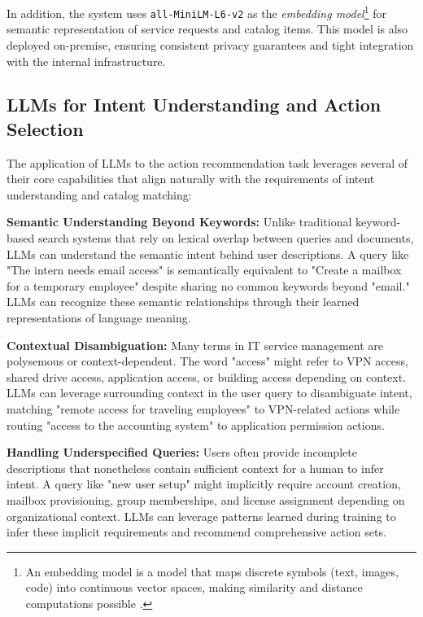 In addition, the system uses \texttt{all-MiniLM-L6-v2} as the \textit{embedding model}\footnote{An embedding model is a model that maps discrete symbols (text, images, code) into continuous vector spaces, making similarity and distance computations possible \cite{karpukhin2020densepassageretrievalopendomain}.} \cite{wang2020minilm} for semantic representation of service requests and catalog items. This model is also deployed on-premise, ensuring consistent privacy guarantees and tight integration with the internal infrastructure.

\subsection{LLMs for Intent Understanding and Action Selection}

The application of LLMs to the action recommendation task leverages several of their core capabilities that align naturally with the requirements of intent understanding and catalog matching:

\textbf{Semantic Understanding Beyond Keywords:} Unlike traditional keyword-based search systems that rely on lexical overlap between queries and documents, LLMs can understand the semantic intent behind user descriptions. A query like "The intern needs email access" is semantically equivalent to "Create a mailbox for a temporary employee" despite sharing no common keywords beyond "email." LLMs can recognize these semantic relationships through their learned representations of language meaning.

\textbf{Contextual Disambiguation:} Many terms in IT service management are polysemous or context-dependent. The word "access" might refer to VPN access, shared drive access, application access, or building access depending on context. LLMs can leverage surrounding context in the user query to disambiguate intent, matching "remote access for traveling employees" to VPN-related actions while routing "access to the accounting system" to application permission actions.

\textbf{Handling Underspecified Queries:} Users often provide incomplete descriptions that nonetheless contain sufficient context for a human to infer intent. A query like "new user setup" might implicitly require account creation, mailbox provisioning, group memberships, and license assignment depending on organizational context. LLMs can leverage patterns learned during training to infer these implicit requirements and recommend comprehensive action sets.

